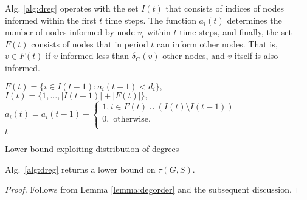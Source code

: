 Alg. \ref{alg:dreg} operates with the set $I(t)$ that consists of indices of nodes informed within the first $t$ time steps.
The function $a_i(t)$ determines the number of nodes informed by node $v_i$ within $t$ time steps, and finally,
the set $F(t)$ consists of nodes that in period $t$ can inform other nodes.
That is, $v\in F(t)$ if $v$ informed less than $\delta_G(v)$ other nodes, and $v$ itself is also informed.

\begin{algorithm}
 {
	$F(t)=\{i\in I(t-1):a_i(t-1)<d_i\},$\\
	$I(t)=\{1,\dots,|I(t-1)|+|F(t)|\},$\\
	$a_i(t)=a_i(t-1)+
	\begin{cases}
		1, i\in F(t)\cup \left(I(t)\setminus I(t-1)\right) \\
		0, \text{ otherwise. }\\
	\end{cases}$\\
	 {\Return $t$}
		
}
\caption{Lower bound exploiting distribution of degrees}
\label{alg:dreg}
\end{algorithm}


\begin{proposition}
Alg.~\ref{alg:dreg} returns a lower bound on $\tau(G,S)$.
\label{cor:deg}
\end{proposition}
\begin{proof}
		Follows from Lemma \ref{lemma:degorder} and the subsequent discussion. 
\end{proof}

